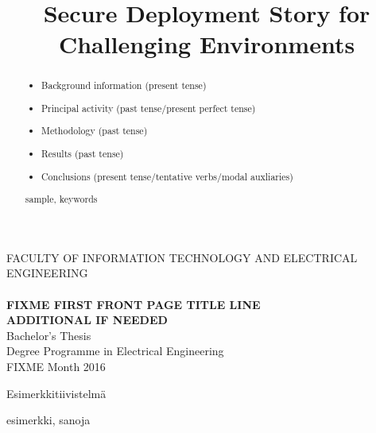 \documentclass[a4paper,12pt,titlepage]{dithesis}
\title{Secure Deployment Story for Challenging Environments}
\begin{document}
\begin{titlepage}
	{{\small FACULTY OF INFORMATION TECHNOLOGY AND ELECTRICAL ENGINEERING}\\}
	\vspace{65 mm}
	{\textbf{\LARGE \getfirstname\ \getlastname }\\}
	\vspace{15 mm}
	{\textbf{\LARGE FIXME FIRST FRONT PAGE TITLE LINE\\ADDITIONAL IF NEEDED\\}}
	\vspace{70 mm}
	{\large {Bachelor's Thesis}\\}
	{\large {Degree Programme in Electrical Engineering}\\}
	{\large {FIXME Month 2016}\\}
\end{titlepage}


\begin{abstract}

\begin{itemize}
\item Background information (present tense)
\item Principal activity (past tense/present perfect tense)
\item Methodology (past tense)
\item Results (past tense)
\item Conclusions (present tense/tentative verbs/modal auxliaries)
\end{itemize}

\keywords sample, keywords
\end{abstract}

\begin{tiivistelma}
Esimerkkitiivistelmä

\avainsanat esimerkki, sanoja
\end{tiivistelma}
\end{document}
